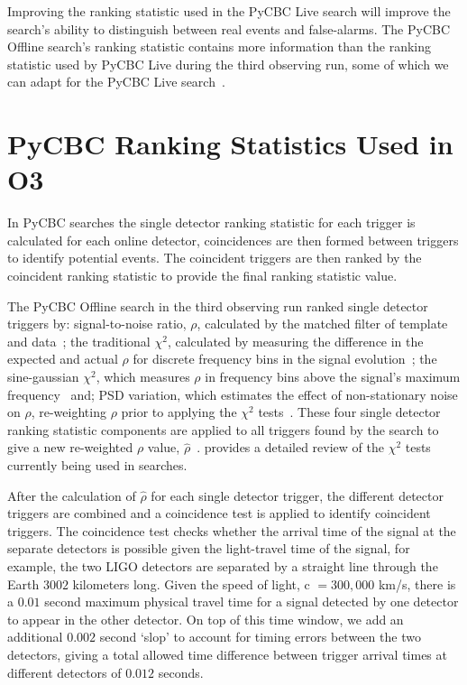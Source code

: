 Improving the ranking statistic used in the PyCBC Live search will improve the search's ability to distinguish between real \gwadj events and false-alarms. The PyCBC Offline search's ranking statistic contains more information than the ranking statistic used by PyCBC Live during the third observing run, some of which we can adapt for the PyCBC Live search~\cite{PSD_var:2020, PyCBC:2017, PyCBC_global:2020}.

\section{\label{5:sec:previous-stat}PyCBC Ranking Statistics Used in O3}

In PyCBC searches the single detector ranking statistic for each trigger is calculated for each online detector, coincidences are then formed between triggers to identify potential \gwadj events. The coincident triggers are then ranked by the coincident ranking statistic to provide the final ranking statistic value. 

The PyCBC Offline search in the third observing run ranked single detector triggers by: signal-to-noise ratio, $\rho$, calculated by the matched filter of template and data~\cite{FINDCHIRP:2012}; the traditional $\chi^{2}$, calculated by measuring the difference in the expected and actual $\rho$ for discrete frequency bins in the signal evolution~\cite{Allen_Chi:2005}; the sine-gaussian $\chi^{2}$, which measures $\rho$ in frequency bins above the signal's maximum frequency~\cite{PyCBC_sg:2018} and; PSD variation, which estimates the effect of non-stationary noise on $\rho$, re-weighting $\rho$ prior to applying the $\chi^{2}$ tests~\cite{PSD_var:2020}. These four single detector ranking statistic components are applied to all triggers found by the search to give a new re-weighted $\rho$ value, $\hat{\rho}$~\cite{rw_snr_eq:2012}. \cite{McIsaac_Chi:2022} provides a detailed review of the $\chi^{2}$ tests currently being used in \gwadj searches.

After the calculation of $\hat{\rho}$ for each single detector trigger, the different detector triggers are combined and a coincidence test is applied to identify coincident triggers. The coincidence test checks whether the arrival time of the \gwadj signal at the separate detectors is possible given the light-travel time of the \gwadj signal, for example, the two LIGO detectors are separated by a straight line through the Earth $3002$ kilometers long. Given the speed of light, c $= 300,000$ km/s, there is a $0.01$ second maximum physical travel time for a signal detected by one detector to appear in the other detector. On top of this time window, we add an additional $0.002$ second `slop' to account for timing errors between the two detectors, giving a total allowed time difference between trigger arrival times at different detectors of $0.012$ seconds.

